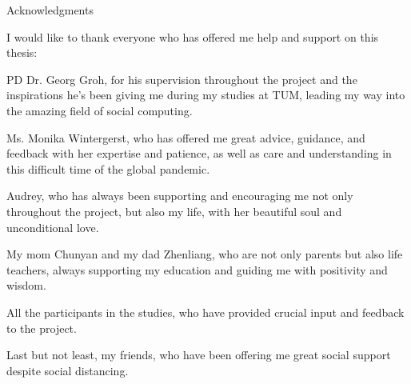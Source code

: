 \thispagestyle{empty}

\vspace*{20mm}

\begin{center}
{ Acknowledgments}
\end{center}

\vspace{10mm}

\indent I would like to thank everyone who has offered me help and support on this thesis:\bigskip

\indent PD Dr. Georg Groh, for his supervision throughout the project and
the inspirations he's been giving me during my studies at TUM, leading my way
into the amazing field of social computing.\bigskip

\indent Ms. Monika Wintergerst, who has offered me great advice, guidance, and feedback with her expertise and patience, as well as care and understanding in this difficult time of the global pandemic.\bigskip

\indent Audrey, who has always been supporting and encouraging me not only throughout the project, but also my life, with her beautiful soul and unconditional love.\bigskip

\indent My mom Chunyan and my dad Zhenliang, who are not only parents but also life teachers,
always supporting my education and guiding me with positivity and wisdom.\bigskip

\indent All the participants in the studies, who have provided crucial input and feedback
to the project.\bigskip

\indent Last but not least, my friends, who have been offering me great social support despite social distancing.

\cleardoublepage{}
